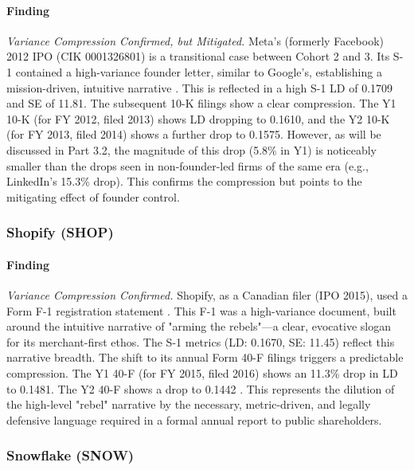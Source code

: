 \documentclass[12pt, letterpaper]{article}
\begin{document}
\paragraph{Finding} \textit{Variance Compression Confirmed, but Mitigated.}
Meta's (formerly Facebook) 2012 IPO (CIK 0001326801) is a transitional case between Cohort 2 and 3. Its S-1 contained a high-variance founder letter, similar to Google's, establishing a mission-driven, intuitive narrative \cite{key6, key38}. This is reflected in a high S-1 LD of 0.1709 and SE of 11.81. The subsequent 10-K filings show a clear compression. The Y1 10-K (for FY 2012, filed 2013) \cite{key39} shows LD dropping to 0.1610, and the Y2 10-K (for FY 2013, filed 2014) \cite{key40} shows a further drop to 0.1575. However, as will be discussed in Part 3.2, the magnitude of this drop (5.8\% in Y1) is noticeably smaller than the drops seen in non-founder-led firms of the same era (e.g., LinkedIn's 15.3\% drop). This confirms the compression but points to the mitigating effect of founder control.

\subsubsection{Shopify (SHOP)}
\paragraph{Finding} \textit{Variance Compression Confirmed.}
Shopify, as a Canadian filer (IPO 2015), used a Form F-1 registration statement \cite{key14, key41}. This F-1 was a high-variance document, built around the intuitive narrative of "arming the rebels"—a clear, evocative slogan for its merchant-first ethos. The S-1 metrics (LD: 0.1670, SE: 11.45) reflect this narrative breadth. The shift to its annual Form 40-F filings triggers a predictable compression. The Y1 40-F (for FY 2015, filed 2016) \cite{key42} shows an 11.3\% drop in LD to 0.1481. The Y2 40-F shows a drop to 0.1442 \cite{key43}. This represents the dilution of the high-level "rebel" narrative by the necessary, metric-driven, and legally defensive language required in a formal annual report to public shareholders.

\subsubsection{Snowflake (SNOW)}
\end{document}
